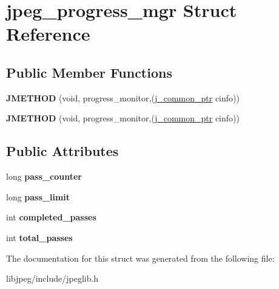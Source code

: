 \hypertarget{structjpeg__progress__mgr}{\section{jpeg\-\_\-progress\-\_\-mgr Struct Reference}
\label{structjpeg__progress__mgr}
}
\subsection*{Public Member Functions}
\begin{DoxyCompactItemize}
\item 
\hypertarget{structjpeg__progress__mgr_aa6fbc36158dd82f586d752f976ad7fa3}{{\bfseries J\-M\-E\-T\-H\-O\-D} (void, progress\-\_\-monitor,(\hyperlink{structjpeg__common__struct}{j\-\_\-common\-\_\-ptr} cinfo))}\label{structjpeg__progress__mgr_aa6fbc36158dd82f586d752f976ad7fa3}

\item 
\hypertarget{structjpeg__progress__mgr_aa6fbc36158dd82f586d752f976ad7fa3}{{\bfseries J\-M\-E\-T\-H\-O\-D} (void, progress\-\_\-monitor,(\hyperlink{structjpeg__common__struct}{j\-\_\-common\-\_\-ptr} cinfo))}\label{structjpeg__progress__mgr_aa6fbc36158dd82f586d752f976ad7fa3}

\end{DoxyCompactItemize}
\subsection*{Public Attributes}
\begin{DoxyCompactItemize}
\item 
\hypertarget{structjpeg__progress__mgr_ae52d1c89154d3f15ea44f96ee1c4ea7f}{long {\bfseries pass\-\_\-counter}}\label{structjpeg__progress__mgr_ae52d1c89154d3f15ea44f96ee1c4ea7f}

\item 
\hypertarget{structjpeg__progress__mgr_a68ec6ba74838f7b2b8ded8d4c8254c1d}{long {\bfseries pass\-\_\-limit}}\label{structjpeg__progress__mgr_a68ec6ba74838f7b2b8ded8d4c8254c1d}

\item 
\hypertarget{structjpeg__progress__mgr_a0cf4c1c84b2662763053e0eeaca417f3}{int {\bfseries completed\-\_\-passes}}\label{structjpeg__progress__mgr_a0cf4c1c84b2662763053e0eeaca417f3}

\item 
\hypertarget{structjpeg__progress__mgr_a35d61747861f284526a9b312b3dc59ca}{int {\bfseries total\-\_\-passes}}\label{structjpeg__progress__mgr_a35d61747861f284526a9b312b3dc59ca}

\end{DoxyCompactItemize}


The documentation for this struct was generated from the following file\-:\begin{DoxyCompactItemize}
\item 
libjpeg/include/jpeglib.\-h\end{DoxyCompactItemize}
